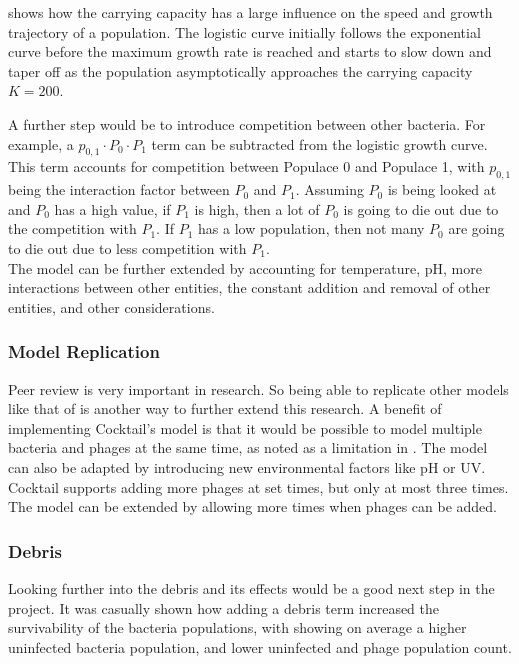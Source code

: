  shows how the carrying capacity has a large influence on the speed and growth trajectory of a population. 
The logistic curve initially follows the exponential curve before the maximum growth rate is reached and starts to slow down and taper off as the population asymptotically approaches the carrying capacity $K=200$. 

A further step would be to introduce competition between other bacteria. 
For example, a $p_{0, 1}\cdot P_0 \cdot P_1$ term can be subtracted from the logistic growth curve. 
This term accounts for competition between Populace 0 and Populace 1, with $p_{0, 1}$ being the interaction factor between $P_0$ and $P_1$. 
Assuming $P_0$ is being looked at and $P_0$ has a high value, if $P_1$ is high, then a lot of $P_0$ is going to die out due to the competition with $P_1$. 
If $P_1$ has a low population, then not many $P_0$ are going to die out due to less competition with $P_1$. \\ 

The model can be further extended by accounting for temperature, pH, more interactions between other entities, the constant addition and removal of other entities, and other considerations. 

\subsubsection{Model Replication}
Peer review is very important in research. 
So being able to replicate other models like that of \citet{nilssonCocktailComputerProgram2022} is another way to further extend this research. 
A benefit of implementing Cocktail's model is that it would be possible to model multiple bacteria and phages at the same time, as noted as a limitation in . 
The model can also be adapted by introducing new environmental factors like pH or UV. 
Cocktail supports adding more phages at set times, but only at most three times. 
The model can be extended by allowing more times when phages can be added. 

\subsubsection{Debris}
Looking further into the debris and its effects would be a good next step in the project. 
It was casually shown how adding a debris term increased the survivability of the bacteria populations, with showing on average a higher uninfected bacteria population, and lower uninfected and phage population count. 


